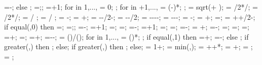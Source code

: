 {{{\superstorynumber=\storynumber-\subfloors;}
else
{;
\superstorynumber=\storynumber;};
=+1;
for \idefl in {1,...,{}}{
	 = 0;
};
for \idefl in {+1,...,{\levelnumber}}{
	 = (\idefl-)*\drift;
};
\tempdim = sqrt( + );
\fixbeamx = \collinet/2*/\tempdim;
\fixbeamy = \collinet/2*/\tempdim;
 =  / \storyheight * \baywidth;
 =  / \storyheight * \baywidth;
\rigbasestartx = -\supportwidth;
\rigbaseendx = \x{\columnnumber}+\supportwidth;
\isoboty = -\supportheight-\baselinet/2-\isolationdepth;
\isotopy = -\supportheight-\baselinet/2;
\foundboty = -\supportheight-\baselinet-\isolationdepth-\foundationdepth;
\foundtopy = -\supportheight-\baselinet-\isolationdepth;
\foundstartx = -\foundsidew;
\foundendx = \x{\columnnumber}+\foundsidew;
\structheight=\storynumber*\storyheight;
\isomidy = \supportheight+\isolinet+\isolationdepth/2-\baselinet;
if equal(\showopenstory,0) then
{\leftstory=\subfloors;
\rightstory=\subfloors;};
\leftopenstory=\subfloors-\leftstory;
\leftlevel=\leftstory+1;
\leftwallh=\leftstory*\storyheight;
\leftopenh=\leftopenstory*\storyheight;
\rightopenstory=\subfloors-\rightstory;
\rightlevel=\rightstory+1;
\rightwallh=\rightstory*\storyheight;
\rightopenh=\rightopenstory*\storyheight;
\diffwallh=\leftwallh-\rightwallh;
\soilbelowfoundtof = \soilbelowfound+\supportheight;
\basewallstartx=-\supportwidth;
\buildingwidth=\baynumber*\baywidth;
\basewalldepth=\subfloors*\storyheight;
\basewallstarty=\basewalldepth;
\basewallendx=\buildingwidth+\supportwidth;
\basewallendy=\basewallstarty;
\rightsoilx=\buildingwidth+\rightsoildist;
\rightsoily=\rightwallh-\rightsoildepth-\supportheight;
\isospace = (\buildingwidth)/();
for \kiso in {1,...,{\numberofisolators}}{
\xiso{\kiso} = ()*\isospace;
};
if equal(\isoshiftyn,1) then
{=+\isoshift;
\xiso{\numberofisolators}=\xiso{\numberofisolators}-\isoshift;}
else {};
if greater(\doflocfloor,\storynumber) then {;} else{};
if greater(\dofloccolumn,\columnnumber) then {;} else{};
\dofloch = 1+\doflocfloor;
\minlen = min(\storyheight,\baywidth);
\dofxx = \x{\dofloccolumn}+\dofoffsetratio*\minlen+*\showdefl;
\dofyy = \y{\dofloch}+\dofoffsetratio*\minlen;
\arrlen = \arrowlenratio*\minlen;
\arrrad = \rotarrowlenratio*\minlen;
}}
